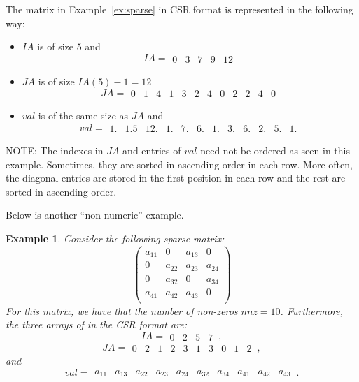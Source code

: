 \documentclass[11pt]{memoir}
\newtheorem{example}[theorem]{Example}
\begin{document}
The matrix in Example~\ref{ex:sparse} in CSR format is represented in the following way:
\begin{itemize}
\item $IA$ is of size $5$ and
$$IA =
\begin{array}{||c|c|c|c|c||}0&3&7&9&12\end{array}
$$
\item $JA$ is of size $IA(5)-1=12$
$$JA =
\begin{array}{||c|c|c||c|c|c|c||c|c||c|c|c||}
0&1&4&1&3&2&4&0&2&2&4&0
\end{array}
$$
\item $val$ is of the same size as $JA$ and
$$val =
\begin{array}{||c|c|c||c|c|c|c||c|c||c|c|c||}
1.&1.5&12.&1.&7.&6.&1.&3.&6.&2.&5.&1.
\end{array}
$$
\end{itemize}

\begin{snugshade}\noindent
NOTE: The indexes in $JA$ and entries of $val$ need not be ordered as seen in this example. Sometimes, they are sorted in ascending order in each row. More often, the diagonal entries are stored in the first position in each row and the rest are sorted in ascending order.
\end{snugshade}

Below is another ``non-numeric'' example.
%
\begin{example} Consider the following sparse matrix:
$$
\left(
\begin{array}{cccc}
a_{11} & 0 & a_{13} & 0 \\
0 & a_{22} & a_{23} & a_{24} \\
0 & a_{32} & 0 & a_{34} \\
a_{41}& a_{42} & a_{43} & 0 \\
\end{array}
\right)
$$
For this matrix, we have that the number of non-zeros $nnz=10$. Furthermore, the three arrays of in the CSR format are:
$$
IA =
\begin{array}{||c|c|c|c||}0&2&5&7\end{array}\, ,
$$
$$
JA =
\begin{array}{||c|c||c|c|c||c|c||c|c|c||}
0&2&1&2&3&1&3&0&1&2\end{array}\, ,
$$
and
$$
val =
\begin{array}{||c|c||c|c|c||c|c||c|c|c||}
a_{11} & a_{13} & a_{22} & a_{23} & a_{24} & a_{32} & a_{34} & a_{41} & a_{42} & a_{43}\end{array}\,.
$$
\end{example}
\end{document}
